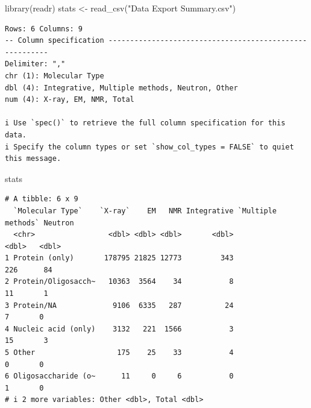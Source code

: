 \documentclass[
  letterpaper,
  DIV=11,
  numbers=noendperiod]{scrartcl}
\newenvironment{Shaded}{\begin{snugshade}}{\end{snugshade}}
\newcommand{\AttributeTok}[1]{\textcolor[rgb]{0.40,0.45,0.13}{#1}}
\newcommand{\FunctionTok}[1]{\textcolor[rgb]{0.28,0.35,0.67}{#1}}
\newcommand{\NormalTok}[1]{\textcolor[rgb]{0.00,0.23,0.31}{#1}}
\newcommand{\OtherTok}[1]{\textcolor[rgb]{0.00,0.23,0.31}{#1}}
\newcommand{\SpecialCharTok}[1]{\textcolor[rgb]{0.37,0.37,0.37}{#1}}
\newcommand{\StringTok}[1]{\textcolor[rgb]{0.13,0.47,0.30}{#1}}
\begin{document}
\begin{Shaded}
\begin{Highlighting}[]
\FunctionTok{library}\NormalTok{(readr)}
\NormalTok{stats }\OtherTok{\textless{}{-}} \FunctionTok{read\_csv}\NormalTok{(}\StringTok{"Data Export Summary.csv"}\NormalTok{)}
\end{Highlighting}
\end{Shaded}

\begin{verbatim}
Rows: 6 Columns: 9
-- Column specification --------------------------------------------------------
Delimiter: ","
chr (1): Molecular Type
dbl (4): Integrative, Multiple methods, Neutron, Other
num (4): X-ray, EM, NMR, Total

i Use `spec()` to retrieve the full column specification for this data.
i Specify the column types or set `show_col_types = FALSE` to quiet this message.
\end{verbatim}

\begin{Shaded}
\begin{Highlighting}[]
\NormalTok{stats}
\end{Highlighting}
\end{Shaded}

\begin{verbatim}
# A tibble: 6 x 9
  `Molecular Type`    `X-ray`    EM   NMR Integrative `Multiple methods` Neutron
  <chr>                 <dbl> <dbl> <dbl>       <dbl>              <dbl>   <dbl>
1 Protein (only)       178795 21825 12773         343                226      84
2 Protein/Oligosacch~   10363  3564    34           8                 11       1
3 Protein/NA             9106  6335   287          24                  7       0
4 Nucleic acid (only)    3132   221  1566           3                 15       3
5 Other                   175    25    33           4                  0       0
6 Oligosaccharide (o~      11     0     6           0                  1       0
# i 2 more variables: Other <dbl>, Total <dbl>
\end{verbatim}

\begin{Shaded}
\end{Shaded}
\end{document}
